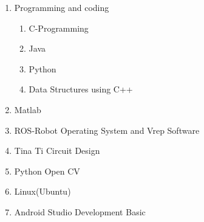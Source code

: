 \documentclass[12pt]{article}
\begin{document}
\begin{enumerate}
	\item {\fontsize{13pt}{15.6pt}\selectfont Programming and coding\par}\par
\begin{enumerate}

	\item {\fontsize{13pt}{15.6pt}\selectfont C-Programming \par}\par

	\item {\fontsize{13pt}{15.6pt}\selectfont  Java\par}\par

	\item {\fontsize{13pt}{15.6pt}\selectfont  Python\par}\par

	\item {\fontsize{13pt}{15.6pt}\selectfont  Data Structures using C++\par}\end{enumerate}\par

	\item {\fontsize{13pt}{15.6pt}\selectfont Matlab\par}\par

	\item {\fontsize{13pt}{15.6pt}\selectfont ROS-Robot Operating System and Vrep Software\par}\par

	\item {\fontsize{13pt}{15.6pt}\selectfont Tina Ti Circuit Design\par}\par

	\item {\fontsize{13pt}{15.6pt}\selectfont Python Open CV\par}\par
	\item {\fontsize{13pt}{15.6pt}\selectfont Linux(Ubuntu)\par}\par
	\item {\fontsize{13pt}{15.6pt}\selectfont Android Studio Development Basic\par}\par


\end{enumerate}
\end{document}
